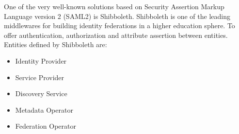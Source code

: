 One of the very well-known solutions based on Security Assertion Markup Language version 2 (SAML2) is Shibboleth. Shibboleth is one of the leading middlewares for building identity federations in a higher education sphere. To offer authentication, authorization and attribute assertion between entities. Entities defined by Shibboleth are:

\begin{itemize}
	\item Identity Provider
	\item Service Provider
	\item Discovery Service
	\item Metadata Operator
	\item Federation Operator
\end{itemize}




\chapterend
